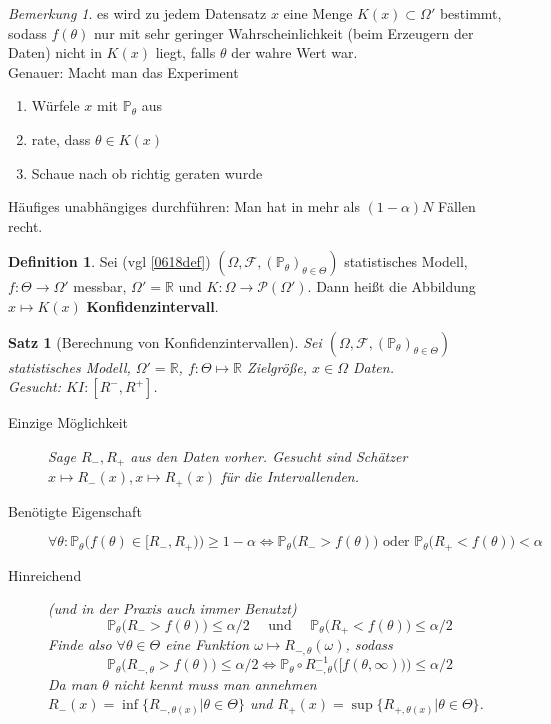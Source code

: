 \documentclass[10pt,a4paper]{article}
\newcommand{\R}{\ensuremath{\mathbb{R}}}
\newcommand{\al}{\ensuremath{\alpha}}
\newcommand{\potset}{\mathscr P}
\newcommand{\Prb}{\mathbb P}
\newcommand{\scF}{\ensuremath{\mathscr{F}}}
\theoremstyle{plain}
\newtheorem{satz}[theorem]{Satz}
\theoremstyle{definition}
\newtheorem{definition}[theorem]{Definition}
\theoremstyle{remark}
\newtheorem{bem}[theorem]{Bemerkung}
\begin{document}
	\begin{bem}
		es wird zu jedem Datensatz $x$ eine Menge $K(x)\subset\Omega'$ bestimmt, sodass $f(\theta)$ nur mit sehr geringer Wahrscheinlichkeit (beim Erzeugern der Daten) nicht in $K(x)$ liegt, falls $\theta$ der wahre Wert war.\\
		Genauer: Macht man das Experiment
		\begin{enumerate}
			\item Würfele $x$ mit $\Prb_\theta$ aus
			\item rate, dass $\theta\in K(x)$
			\item Schaue nach ob richtig geraten wurde
		\end{enumerate}
	Häufiges unabhängiges durchführen: Man hat in mehr als $(1-\al)N$ Fällen recht.
	\end{bem}

	\begin{definition}
		Sei (vgl \ref{0618def}) $(\Omega,\scF,(\Prb_\theta)_{\theta\in\Theta})$ statistisches Modell, $f:\Theta\to\Omega'$ messbar, $\Omega'=\R$ und $K:\Omega\to\potset(\Omega')$. Dann heißt die Abbildung $x\mapsto K(x)$ \textbf{Konfidenzintervall}.
	\end{definition}

	\begin{satz}[Berechnung von Konfidenzintervallen]
		Sei $(\Omega,\scF,(\Prb_\theta)_{\theta\in\Theta})$ statistisches Modell, $\Omega'=\R$, $f:\Theta\mapsto\R$ Zielgröße, $x\in\Omega$ Daten.\\
		Gesucht: $KI:[R^-,R^+]$.
		\begin{description}
			\item[Einzige Möglichkeit] Sage $R_-,R_+$ aus den Daten vorher. Gesucht sind Schätzer $x\mapsto R_-(x),x\mapsto R_+(x)$ für die Intervallenden.
			\item[Benötigte Eigenschaft]
			\[\forall\theta:\Prb_\theta\big(f(\theta)\in[R_-,R_+)\big)\geq 1-\al\Leftrightarrow\Prb_\theta\big(R_->f(\theta)\big)\text{ oder }\Prb_\theta\big(R_+<f(\theta)\big)<\al\]
			\item[Hinreichend] (und in der Praxis auch immer Benutzt)
			\[\Prb_\theta\big(R_->f(\theta)\big)\leq\al/2\quad\text{ und }\quad \Prb_\theta\big(R_+<f(\theta)\big)\leq\al/2\]
			Finde also $\forall\theta\in\Theta$  eine Funktion $\omega\mapsto R_{-,\theta}(\omega)$, sodass 
			\[\Prb_\theta\big(R_{-,\theta}>f(\theta)\big)\leq \al/2\Leftrightarrow\Prb_\theta\circ R^{-1}_{-,\theta}\big([f(\theta,\infty))\big)\leq \al/2\]
			Da man $\theta$ nicht kennt muss man annehmen $R_-(x)=\inf\{R_{-,\theta(x)}|\theta\in\Theta\}$ und $R_+(x)=\sup\{R_{+,\theta(x)}|\theta\in\Theta\}$.
		\end{description}
	\end{satz}
\end{document}
